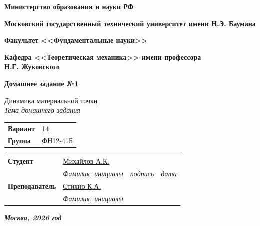 \documentclass{article}
\begin{document}
\fontsize{14}{16}\selectfont

\begin{titlepage}
	\begin{flushleft}
		{\Large\textbf{Министерство образования и науки РФ}}
		
		\vspace{1cm}
		
		{\Large\textbf{Московский государственный технический университет имени Н.Э. Баумана}}
		
		\vspace{1cm}
		
		{\Large\textbf{Факультет <<Фундаментальные науки>>}}
		
		\vspace{1cm}
		
		{\Large\textbf{Кафедра <<Теоретическая механика>> имени профессора\\Н.Е. Жуковского}}
		
		\vspace{3cm}
		
		\textbf{\Large Домашнее задание №\underline{1}}
		
		\vspace{0.4cm}
		
		\underline{Динамика материальной точки}\\[-1mm]
		
		{\normalsize \textit{Тема домашнего задания}}
		
		\vspace{1cm}
		
		\begin{tabular}{@{} p{2cm} p{3cm} @{}}
			\textbf{Вариант} & \underline{14} \tabularnewline[4mm]
			\textbf{Группа} & \underline{ФН12-41Б}
		\end{tabular}
		
		\vspace{2cm}
		
		\begin{tabular}{@{} p{3.8cm} p{5.4cm} p{2.5cm} p{3cm} @{}}
			\textbf{Студент} & \underline{Михайлов А.К.} & \hrulefill & \hrulefill \\[-1mm]
			
			& {\normalsize \textit{Фамилия, инициалы}} & {\normalsize \textit{подпись}} & {\normalsize \textit{дата}} \tabularnewline[6mm]
			
			\textbf{Преподаватель} & \underline{Стихно К.А.} & & \\[-1mm]
			
			& {\normalsize \textit{Фамилия, инициалы}} & &
		\end{tabular}
		
		\vfill
		
		\textbf{\textit{Москва, 20\underline{26} год}}
	\end{flushleft}
\end{titlepage}
\end{document}
